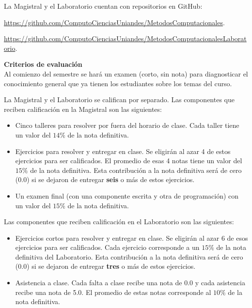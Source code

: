 \documentclass[letterpaper,10pt,onecolumn]{article}
\begin{document}
La Magistral y el Laboratorio cuentan con repositorios  en GitHub:

\url{https://github.com/ComputoCienciasUniandes/MetodosComputacionales}. 

\url{https://github.com/ComputoCienciasUniandes/MetodosComputacionalesLaboratorio}. 


\vspace*{0.5cm} 
\noindent\textbf{\large {} \quad Criterios de
  evaluaci\'on}\\[-0.2cm] 

Al comienzo del semestre se har\'a un examen (corto, sin nota) para
diagnosticar el conocimiento general que ya tienen los estudiantes
sobre los temas del curso. 

La Magistral y el Laboratorio se califican por separado. Las
componentes que reciben calificaci\'on en la Magistral son las
siguientes:

\begin{itemize}
\item 
Cinco talleres para resolver por fuera del horario de clase. 
Cada taller tiene un valor del $14\%$ de la nota definitiva.  
\item 
Ejercicios para resolver y entregar en clase. 
Se eligir\'an al azar 4 de estos ejercicios para ser calificados. 
El promedio de esas 4 notas tiene un valor del $15\%$ de la nota
definitiva. 
Esta contribuci\'on a la nota definitiva ser\'a de cero (0.0) si se
dejaron de entregar {\bf seis} o m\'as de estos ejercicios. 
\item
Un examen final (con una componente escrita y otra de
programaci\'on) con un valor del $15\%$ de la nota definitiva.  
\end{itemize}

Las componentes que reciben calificaci\'on en el Laboratorio son las
siguientes:
\begin{itemize}
\item
Ejercicios cortos para resolver  y entregar en
clase.  
Se eligir\'an al azar 6 de esos ejercicios para ser calificados. 
Cada ejercicio corresponde a un $15\%$ de la nota definitiva del
Laboratorio. 
Esta contribuci\'on a la nota definitiva ser\'a de cero (0.0) si se
dejaron de entregar {\bf tres} o m\'as de estos ejercicios. 
\item
Asistencia a clase. Cada falta a clase recibe una nota de 0.0 y cada
asistencia recibe una nota de 5.0. El promedio de estas notas
corresponde al $10\%$ de la nota definitiva.
\end{itemize}
\end{document}

